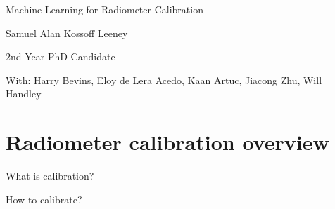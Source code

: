 \documentclass[aspectratio=169]{beamer}
\begin{document}
\begin{frame}
	\begin{center}
		{\huge Machine Learning for Radiometer Calibration\par}
		\vspace{0.5cm}


		{\large Samuel Alan Kossoff Leeney\par}

		{\small 2nd Year PhD Candidate\par}
		\vspace{0.5cm}


		{\footnotesize With: Harry Bevins, Eloy de Lera Acedo, Kaan Artuc, Jiacong Zhu, Will Handley \par}

		\vfill

		


	\end{center}
	\vfill
\end{frame}
\section{Radiometer calibration overview}
\begin{frame}{\small{What is calibration?}}
	\begin{figure}[h]
		\centering
		
	\end{figure}
	\vfill
\end{frame}

\begin{frame}{\small{How to calibrate?}}
	\begin{figure}[h]
		\centering
		
	\end{figure}
	\vspace{0.7cm}
	\vfill
\end{frame}
\end{document}
